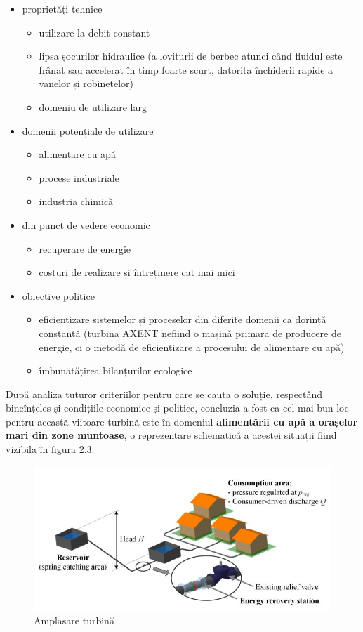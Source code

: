 \begin{itemize}
	\item proprietăți tehnice
		\begin{itemize}
			\item utilizare la debit constant
			\item lipsa șocurilor hidraulice (a loviturii de berbec atunci când fluidul este frânat sau accelerat în timp foarte scurt, datorita închiderii rapide a vanelor și robinetelor)
			\item domeniu de utilizare larg
		\end{itemize}
	\item domenii potențiale de utilizare
		\begin{itemize}
			\item alimentare cu apă
			\item procese industriale
			\item industria chimică
		\end{itemize}
	\item din punct de vedere economic
		\begin{itemize}
			\item recuperare de energie
			\item costuri de realizare și întreținere cat mai mici
		\end{itemize}
	\item obiective politice
		\begin{itemize}
			\item eficientizare sistemelor și proceselor din diferite domenii ca dorință constantă (turbina AXENT nefiind o mașină primara de producere de energie, ci o metodă de eficientizare a procesului de alimentare cu apă)
			\item îmbunătățirea bilanțurilor ecologice
		\end{itemize}	
\end{itemize}

După analiza tuturor criteriilor pentru care se cauta o soluție, respectând bineînțeles și condițiile economice și politice, concluzia a fost ca cel mai bun loc pentru această viitoare turbină este în domeniul \textbf{alimentării cu apă a orașelor mari din zone muntoase}, o reprezentare schematică a acestei situații fiind vizibila în figura 2.3.

\begin{figure}[h!]
	\centering
	\includegraphics[scale=0.5]{figures/amplasare_turbina.jpg}
	\caption{Amplasare turbină \protect\cite{andolfatto2016simulation}}
	\label{Amplasare turbin\u{a}}
\end{figure}

